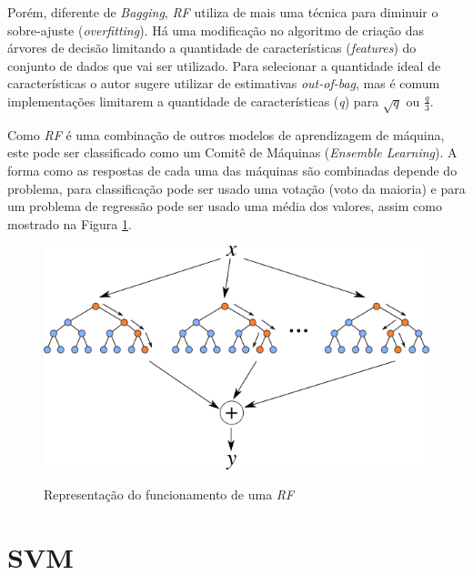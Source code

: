 Porém, diferente de \textit{Bagging}, \textit{\acrshort{RF}} utiliza de mais uma técnica para diminuir o sobre-ajuste (\textit{overfitting}). Há uma modificação no algoritmo de criação das árvores de decisão limitando a quantidade de características (\textit{features}) do conjunto de dados que vai ser utilizado. Para selecionar a quantidade ideal de características o autor sugere utilizar de estimativas \textit{out-of-bag}, mas é comum implementações limitarem a quantidade de características (\textit{q}) para $ \sqrt{q} $ ou $ \frac{q}{3} $.

Como \textit{\acrshort{RF}} é uma combinação de outros modelos de aprendizagem de máquina, este pode ser classificado como um Comitê de Máquinas (\textit{Ensemble Learning}). A forma como as respostas de cada uma das máquinas são combinadas depende do problema, para classificação pode ser usado uma votação (voto da maioria) e para um problema de regressão pode ser usado uma média dos valores, assim como mostrado na Figura \ref{figure:rf}.

\begin{figure}[h]
    \centering
    \includegraphics[scale=0.8]{monography/img/random_forest.png}
    \label{figure:rf}
    \caption{Representação do funcionamento de uma \textit{\acrshort{RF}}\footnotemark}
\end{figure}



\section{\acrfull{SVM}}

